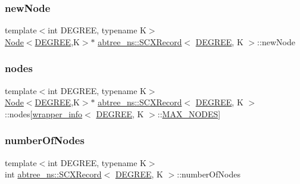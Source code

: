 \subsubsection{\texorpdfstring{new\+Node}{newNode}}
{\footnotesize\ttfamily template$<$int D\+E\+G\+R\+EE, typename K$>$ \\
\hyperlink{structabtree__ns_1_1Node}{Node}$<$\hyperlink{brown__sigouin__abtree__kcas_2adapter_8h_a5d88b17d70c985f2f2b8e987037fd6dd}{D\+E\+G\+R\+EE},K$>$$\ast$ \hyperlink{structabtree__ns_1_1SCXRecord}{abtree\+\_\+ns\+::\+S\+C\+X\+Record}$<$ \hyperlink{brown__sigouin__abtree__kcas_2adapter_8h_a5d88b17d70c985f2f2b8e987037fd6dd}{D\+E\+G\+R\+EE}, K $>$\+::new\+Node}

\mbox{\label{structabtree__ns_1_1SCXRecord_a8748b6aeafb8c5d9e4b1854cfb3184e3}} 
\subsubsection{\texorpdfstring{nodes}{nodes}}
{\footnotesize\ttfamily template$<$int D\+E\+G\+R\+EE, typename K$>$ \\
\hyperlink{structabtree__ns_1_1Node}{Node}$<$\hyperlink{brown__sigouin__abtree__kcas_2adapter_8h_a5d88b17d70c985f2f2b8e987037fd6dd}{D\+E\+G\+R\+EE},K$>$$\ast$ \hyperlink{structabtree__ns_1_1SCXRecord}{abtree\+\_\+ns\+::\+S\+C\+X\+Record}$<$ \hyperlink{brown__sigouin__abtree__kcas_2adapter_8h_a5d88b17d70c985f2f2b8e987037fd6dd}{D\+E\+G\+R\+EE}, K $>$\+::nodes\mbox{[}\hyperlink{classabtree__ns_1_1wrapper__info}{wrapper\+\_\+info}$<$ \hyperlink{brown__sigouin__abtree__kcas_2adapter_8h_a5d88b17d70c985f2f2b8e987037fd6dd}{D\+E\+G\+R\+EE}, K $>$\+::\hyperlink{scxrecord_8h_abd2aacdca9cb2a1a30f3392256b96ea3}{M\+A\+X\+\_\+\+N\+O\+D\+ES}\mbox{]}}

\mbox{\label{structabtree__ns_1_1SCXRecord_a69bfa2456660401bf10a86c10778092c}} 
\subsubsection{\texorpdfstring{number\+Of\+Nodes}{numberOfNodes}}
{\footnotesize\ttfamily template$<$int D\+E\+G\+R\+EE, typename K$>$ \\
int \hyperlink{structabtree__ns_1_1SCXRecord}{abtree\+\_\+ns\+::\+S\+C\+X\+Record}$<$ \hyperlink{brown__sigouin__abtree__kcas_2adapter_8h_a5d88b17d70c985f2f2b8e987037fd6dd}{D\+E\+G\+R\+EE}, K $>$\+::number\+Of\+Nodes}

